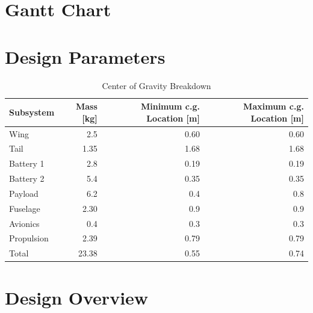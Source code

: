 \chapter{Gantt Chart}
\setlength{\parindent}{15pt}
\label{ch:gant_char}




\chapter{Design Parameters}

\begin{table}[htb]
\centering
\caption{Center of Gravity Breakdown}
\label{tab:cgbreakdown}
\begin{tabular}{lrrr}
\toprule
\textbf{Subsystem} & \textbf{Mass [kg]} & \textbf{Minimum c.g. Location [m]} & \textbf{Maximum c.g. Location [m]} \\ \midrule
Wing & 2.5 & 0.60 & 0.60 \\ \hdashline
Tail & 1.35 & 1.68 & 1.68 \\ \hdashline
Battery 1 & 2.8 & 0.19 & 0.19 \\ \hdashline
Battery 2 & 5.4 & 0.35 & 0.35 \\ \hdashline
Payload & 6.2 & 0.4 & 0.8 \\ \hdashline
Fuselage & 2.30 & 0.9 & 0.9 \\ \hdashline
Avionics & 0.4 & 0.3 & 0.3 \\ \hdashline
Propulsion & 2.39 & 0.79 & 0.79 \\ \midrule
Total & 23.38 & 0.55 & 0.74 \\ \bottomrule
\end{tabular}
\end{table}


\chapter{Design Overview}
\label{ch:add_catia}

